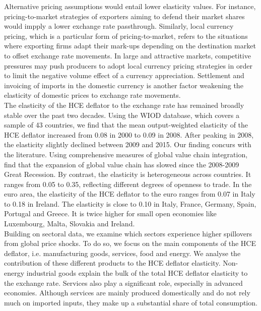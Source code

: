 \documentclass[12pt,a4paper]{paper}
\begin{document}
Alternative pricing assumptions would entail lower elasticity values. 
For instance, pricing-to-market strategies of exporters aiming to defend their market shares would impply a lower exchange rate passthrough.
Similarly, local currency pricing, which is a particular form of pricing-to-market, refers to the situations where exporting firms adapt their mark-ups depending on the destination market to offset exchange rate movements. 
In large and attractive markets, competitive pressures may push producers to adopt local currency pricing strategies in order to limit the negative volume effect of a currency appreciation. 
Settlement and invoicing of imports in the domestic currency is another factor weakening the elasticity of domestic prices to exchange rate movements.\\
The elasticity of the HCE deflator to the exchange rate has remained broadly stable over the past two decades.
Using the WIOD database, which covers a sample of 43 countries, we find that the mean output-weighted elasticity of the HCE deflator increased from 0.08 in 2000 to 0.09 in 2008. 
After peaking in 2008, the elasticity slightly declined between 2009 and 2015. 
Our finding concurs with the literature.
Using comprehensive measures of global value chain integration, \cite{Timmer2016} find that the expansion of global value chain has slowed since the 2008-2009 Great Recession.
By contrast, the elasticity is heterogeneous across countries. It ranges from 0.05 to 0.35, reflecting different degrees of openness to trade. 
In the euro area, the elasticity of the HCE deflator to the euro ranges from 0.07 in Italy to 0.18 in Ireland. 
The elasticity is close to 0.10 in Italy, France, Germany, Spain, Portugal and Greece. 
It is twice higher for small open economies like Luxembourg, Malta, Slovakia and Ireland.\\
Building on sectoral data, we examine which sectors experience higher spillovers from global price shocks. 
To do so, we focus on the main components of the HCE deflator, i.e. manufacturing goods, services, food and energy. 
We analyse the contribution of these different products to the HCE deflator elasticity.
Non-energy industrial goods explain the bulk of the total HCE deflator elasticity to the exchange rate. 
Services also play a significant role, especially in advanced economies. 
Although services are mainly produced domestically and do not rely much on imported inputs, they make up a substantial share of total consumption. \\
\end{document}
